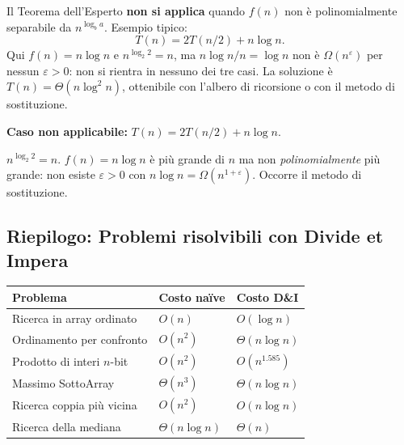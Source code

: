 \begin{osservazione}
	Il Teorema dell'Esperto \textbf{non si applica} quando $f(n)$ non è
	polinomialmente separabile da $n^{\log_b a}$. Esempio tipico:
	\[
	T(n) = 2T(n/2) + n\log n.
	\]
	Qui $f(n) = n\log n$ e $n^{\log_2 2} = n$, ma
	$n\log n / n = \log n$ non è $\Omega(n^\varepsilon)$ per nessun
	$\varepsilon > 0$: non si rientra in nessuno dei tre casi.
	La soluzione è $T(n) = \Theta(n \log^2 n)$, ottenibile con l'albero
	di ricorsione o con il metodo di sostituzione.
\end{osservazione}

\begin{hardnote}
	\textbf{Caso non applicabile:} $T(n) = 2T(n/2) + n\log n$.
	
	$n^{\log_2 2}=n$. $f(n)=n\log n$ è più grande di $n$ ma non
	\textit{polinomialmente} più grande: non esiste $\varepsilon>0$
	con $n\log n = \Omega(n^{1+\varepsilon})$. Occorre il metodo
	di sostituzione.
\end{hardnote}

\subsection{Riepilogo: Problemi risolvibili con Divide et Impera}

\begin{center}
	\renewcommand{\arraystretch}{1.4}
	\begin{tabular}{lll}
		\toprule
		\textbf{Problema} & \textbf{Costo naïve} & \textbf{Costo D\&I} \\
		\midrule
		Ricerca in array ordinato & $O(n)$          & $O(\log n)$      \\
		Ordinamento per confronto & $O(n^2)$        & $\Theta(n\log n)$\\
		Prodotto di interi $n$-bit & $O(n^2)$       & $O(n^{1.585})$   \\
		Massimo SottoArray        & $\Theta(n^3)$   & $\Theta(n\log n)$\\
		Ricerca coppia più vicina  & $O(n^2)$       & $O(n\log n)$     \\
		Ricerca della mediana      & $\Theta(n\log n)$ & $\Theta(n)$   \\
		\bottomrule
	\end{tabular}
\end{center}

